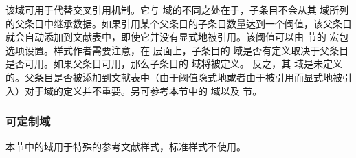 \begin{fieldlist}

该域可用于代替交叉引用机制。它与  域的不同之处在于，子条目不会从其  域所列的父条目中继承数据。如果引用某个父条目的子条目数量达到一个阈值，该父条目就会自动添加到文献表中，即使它并没有显式地被引用。该阈值可以由  节的  宏包选项设置。样式作者需要注意，在 \biblatex 层面上，子条目的  域是否有定义取决于父条目是否可用。如果父条目可用，那么子条目的  域将被定义。
反之，其  域是未定义的。父条目是否被添加到文献表中（由于阈值隐式地或者由于被引用而显式地被引入）对于域的定义并不重要。另可参考本节中的  域以及  节。

\end{fieldlist}

\subsubsection{可定制域}
\label{bib:fld:ctm}


本节中的域用于特殊的参考文献样式，标准样式不使用。

